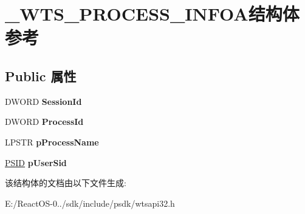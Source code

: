 \hypertarget{struct___w_t_s___p_r_o_c_e_s_s___i_n_f_o_a}{}\section{\+\_\+\+W\+T\+S\+\_\+\+P\+R\+O\+C\+E\+S\+S\+\_\+\+I\+N\+F\+O\+A结构体 参考}
\label{struct___w_t_s___p_r_o_c_e_s_s___i_n_f_o_a}
\subsection*{Public 属性}
\begin{DoxyCompactItemize}
\item 
\mbox{\label{struct___w_t_s___p_r_o_c_e_s_s___i_n_f_o_a_ae0aa33c4a28f59a8f02ee7efca7938ac}} 
D\+W\+O\+RD {\bfseries Session\+Id}
\item 
\mbox{\label{struct___w_t_s___p_r_o_c_e_s_s___i_n_f_o_a_ac5c59d2e7dac2226779b5a41bf1de273}} 
D\+W\+O\+RD {\bfseries Process\+Id}
\item 
\mbox{\label{struct___w_t_s___p_r_o_c_e_s_s___i_n_f_o_a_af22eac839caf718b4d3a755d1712b987}} 
L\+P\+S\+TR {\bfseries p\+Process\+Name}
\item 
\mbox{\label{struct___w_t_s___p_r_o_c_e_s_s___i_n_f_o_a_a8bee3ab79204da08a959195c440ea797}} 
\hyperlink{struct___s_i_d}{P\+S\+ID} {\bfseries p\+User\+Sid}
\end{DoxyCompactItemize}


该结构体的文档由以下文件生成\+:\begin{DoxyCompactItemize}
\item 
E\+:/\+React\+O\+S-\/0../sdk/include/psdk/wtsapi32.\+h\end{DoxyCompactItemize}

